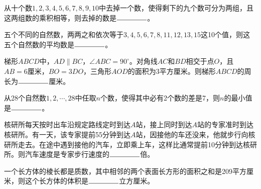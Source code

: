 \begin{question}
  从十个数$1,2,3,4,5,6,7,8,9,10$中去掉一个数，使得剩下的九个数可分为两组，且这两组数的乘积相等，则去掉的数是$\blankline$。
\end{question}


\begin{question}
  五个不同的自然数，两两之和依次等于$3,4,5,6,7,8,11,12,13,15$这10个值，则这五个自然数的平均数是$\blankline$。
\end{question}


\begin{question}
  梯形$ABCD$中，$AD\parallel BC$，$\angle ABC=90^\circ$。对角线$AC$和$BD$相交于点$O$，且$AB=6$厘米，$BO=3DO$，三角形$AOD$的面积为3平方厘米。则梯形$ABCD$的周长为$\blankline$厘米。

  \begin{center}
  \end{center}
\end{question}


\begin{question}
  从28个自然数$1,2,\cdots,28$中任取$n$个数，使得其中必有2个数的差是7，则$n$的最小值是$\blankline$。
\end{question}



\begin{question}
  核研所每天按时出车沿规定路线定时到达$A$站，接上同时到达$A$站的专家准时到达核研所。有一天，该专家提前55分钟到达$A$站，因接他的车还没来，他就步行向核研所走去。在途中遇到接他的汽车，立即乘上车，这样比通常提前10分钟到达核研所。则汽车速度是专家步行速度的$\blankline$倍。
\end{question}


\begin{question}
  一个长方体的棱长都是质数，其中相邻的两个表面长方形的面积之和是209平方厘米，则这个长方体的体积是$\blankline$立方厘米。
\end{question}


